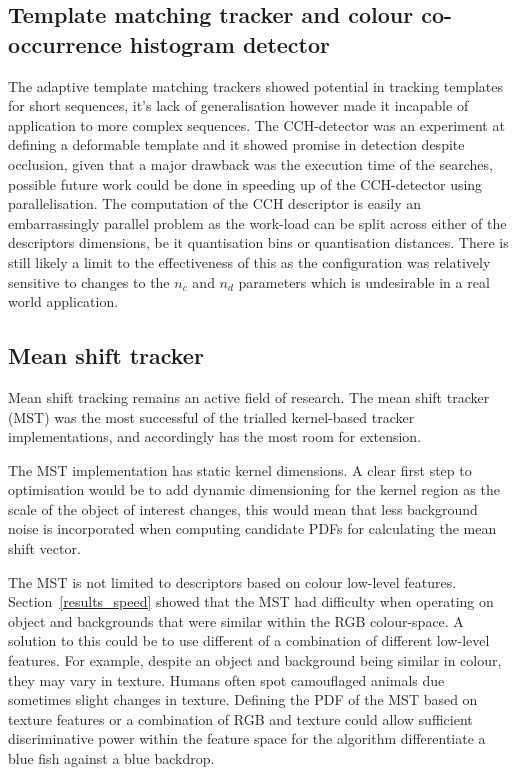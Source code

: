 \subsection{Template matching tracker and colour co-occurrence histogram detector}\label{future_tmt}
The adaptive template matching trackers showed potential in tracking templates for
short sequences, it's lack of generalisation however made it incapable of
application to more complex sequences. 
The CCH-detector was an experiment at defining a deformable template
and it showed promise in detection despite occlusion, given that a major
drawback was the execution time of the searches, possible future work could be
done in speeding up of the CCH-detector using parallelisation. The computation
of the CCH descriptor is easily an embarrassingly parallel problem as the
work-load can be split across either of the descriptors dimensions, be it
quantisation bins or quantisation distances. 
There is still likely a limit to the effectiveness of this as the configuration
was relatively sensitive to changes to the $n_c$ and $n_d$ parameters which is
undesirable in a real world application.

\subsection{Mean shift tracker}\label{future_mst}
Mean shift tracking remains an active field of research. The mean shift tracker
(MST) was the most successful of the trialled kernel-based tracker implementations, and
accordingly has the most room for extension.

The MST implementation has static kernel dimensions. A clear first
step to optimisation would be to add dynamic dimensioning for the kernel region
as the scale of the object of interest changes, this would mean that less
background noise is incorporated when computing candidate PDFs for calculating
the mean shift vector.

The MST is not limited to descriptors based on colour low-level features.
Section~\ref{results_speed} showed that the MST had difficulty when operating on
object and backgrounds that were similar within the RGB colour-space. A solution
to this could be to use different of a combination of different low-level
features. For example, despite an object and background being similar in colour,
they may vary in texture. Humans often spot camouflaged animals due sometimes
slight changes in texture. 
Defining the PDF of the MST based on texture features or a combination of RGB
and texture could allow sufficient discriminative power within the feature space
for the algorithm differentiate a blue fish against a blue backdrop.

